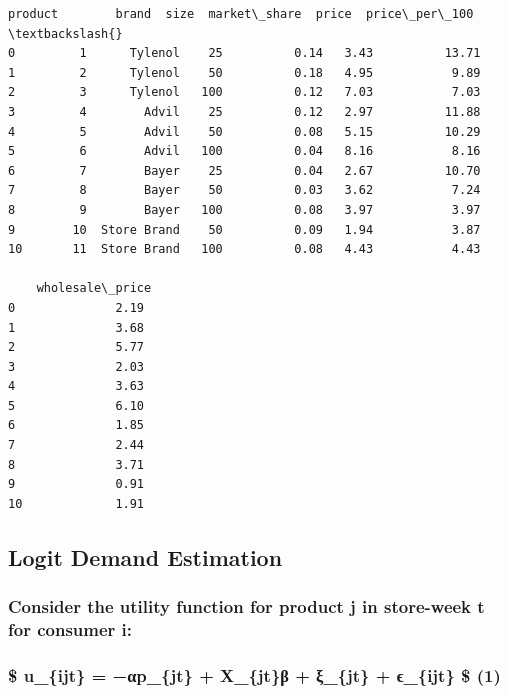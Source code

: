 \documentclass[11pt]{article}
\makeatletter
\newcommand{\boxspacing}{\kern\kvtcb@left@rule\kern\kvtcb@boxsep}
\newcommand{\prompt}[4]{
        {\ttfamily\llap{{\color{#2}[#3]:\hspace{3pt}#4}}\vspace{-\baselineskip}}
    }
\makeatother
\begin{document}
            \begin{tcolorbox}[breakable, size=fbox, boxrule=.5pt, pad at break*=1mm, opacityfill=0]
\prompt{Out}{outcolor}{30}{\boxspacing}
\begin{Verbatim}[commandchars=\\\{\}]
    product        brand  size  market\_share  price  price\_per\_100  \textbackslash{}
0         1      Tylenol    25          0.14   3.43          13.71
1         2      Tylenol    50          0.18   4.95           9.89
2         3      Tylenol   100          0.12   7.03           7.03
3         4        Advil    25          0.12   2.97          11.88
4         5        Advil    50          0.08   5.15          10.29
5         6        Advil   100          0.04   8.16           8.16
6         7        Bayer    25          0.04   2.67          10.70
7         8        Bayer    50          0.03   3.62           7.24
8         9        Bayer   100          0.08   3.97           3.97
9        10  Store Brand    50          0.09   1.94           3.87
10       11  Store Brand   100          0.08   4.43           4.43

    wholesale\_price
0              2.19
1              3.68
2              5.77
3              2.03
4              3.63
5              6.10
6              1.85
7              2.44
8              3.71
9              0.91
10             1.91
\end{Verbatim}
\end{tcolorbox}
        
    \subsection{Logit Demand Estimation}\label{logit-demand-estimation}

\subsubsection*{Consider the utility function for product j in
store-week t for consumer
i:}\label{consider-the-utility-function-for-product-j-in-store-week-t-for-consumer-i}

\subsubsection*{\$ u\_\{ijt\} = −αp\_\{jt\} + X\_\{jt\}β + ξ\_\{jt\} +
ϵ\_\{ijt\} \$ (1)}\label{u_ijt-ux3b1p_jt-x_jtux3b2-ux3be_jt-ux3f5_ijt-1}
\end{document}
